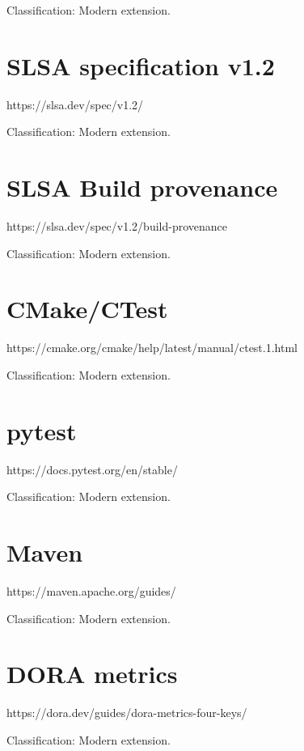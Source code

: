 \documentclass[11pt,letterpaper]{article}
\begin{document}
Classification: Modern extension.

\section{SLSA specification v1.2}
https://slsa.dev/spec/v1.2/

Classification: Modern extension.

\section{SLSA Build provenance}
https://slsa.dev/spec/v1.2/build-provenance

Classification: Modern extension.

\section{CMake/CTest}
https://cmake.org/cmake/help/latest/manual/ctest.1.html

Classification: Modern extension.

\section{pytest}
https://docs.pytest.org/en/stable/

Classification: Modern extension.

\section{Maven}
https://maven.apache.org/guides/

Classification: Modern extension.

\section{DORA metrics}
https://dora.dev/guides/dora-metrics-four-keys/

Classification: Modern extension.
\end{document}

